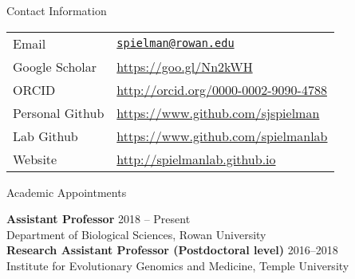 \documentclass{resume} %
\begin{document}
\vspace*{0.5cm}
\begin{rSection}{Contact Information}
\vspace*{0.25cm}

\begin{table}[H]
	\begin{tabular}{ll}
		Email & \texttt{\href{mailto:spielman@rowan.edu}{spielman@rowan.edu}} \\
		Google Scholar & \url{https://goo.gl/Nn2kWH} \\
		ORCID & \url{http://orcid.org/0000-0002-9090-4788} \\
		Personal Github &  \url{https://www.github.com/sjspielman} \\
		Lab Github &  \url{https://www.github.com/spielmanlab} \\
		Website & \url{http://spielmanlab.github.io} \\
	\end{tabular}
\end{table}
\end{rSection}
\vspace*{-0.45cm}



\begin{rSection}{Academic Appointments}
\vspace*{0.25cm}

{\bf Assistant Professor} \hfill {2018 -- Present} \\
Department of Biological Sciences, Rowan University \\


{\bf Research Assistant Professor (Postdoctoral level)} \hfill {2016--2018} \\
Institute for Evolutionary Genomics and Medicine, Temple University \\
\end{rSection}
\end{document}
